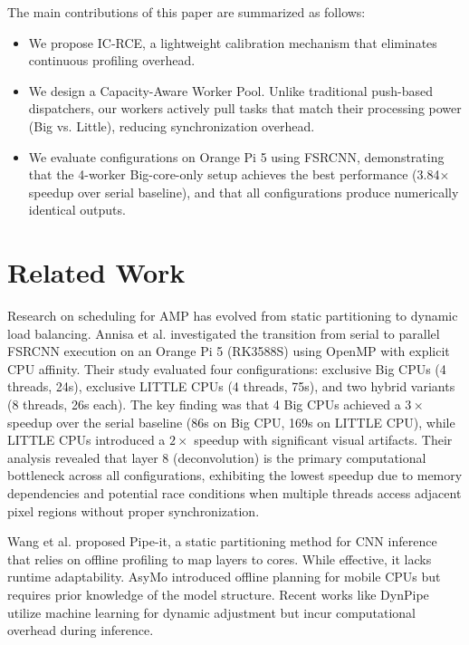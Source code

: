 \documentclass[conference]{IEEEtran}
\begin{document}
The main contributions of this paper are summarized as follows:
\begin{itemize}
\item We propose IC-RCE, a lightweight calibration mechanism that eliminates continuous profiling overhead.
\item We design a Capacity-Aware Worker Pool. Unlike traditional push-based dispatchers, our workers actively pull tasks that match their processing power (Big vs. Little), reducing synchronization overhead.
\item We evaluate configurations on Orange Pi 5 using FSRCNN, demonstrating that the 4-worker Big-core-only setup achieves the best performance (3.84$\times$ speedup over serial baseline), and that all configurations produce numerically identical outputs.
\end{itemize}

\section{Related Work}

Research on scheduling for AMP has evolved from static partitioning to dynamic load balancing. Annisa et al. \cite{annisa2025fsrcnn} investigated the transition from serial to parallel FSRCNN execution on an Orange Pi 5 (RK3588S) using OpenMP with explicit CPU affinity. Their study evaluated four configurations: exclusive Big CPUs (4 threads, 24s), exclusive LITTLE CPUs (4 threads, 75s), and two hybrid variants (8 threads, 26s each). The key finding was that 4 Big CPUs achieved a $3\times$ speedup over the serial baseline (86s on Big CPU, 169s on LITTLE CPU), while LITTLE CPUs introduced a $2\times$ speedup with significant visual artifacts. Their analysis revealed that layer 8 (deconvolution) is the primary computational bottleneck across all configurations, exhibiting the lowest speedup due to memory dependencies and potential race conditions when multiple threads access adjacent pixel regions without proper synchronization.

Wang et al. \cite{wang2020pipeit} proposed Pipe-it, a static partitioning method for CNN inference that relies on offline profiling to map layers to cores. While effective, it lacks runtime adaptability. AsyMo \cite{wang2021asymo} introduced offline planning for mobile CPUs but requires prior knowledge of the model structure. Recent works like DynPipe \cite{yuan2025dynpipe} utilize machine learning for dynamic adjustment but incur computational overhead during inference.
\end{document}
